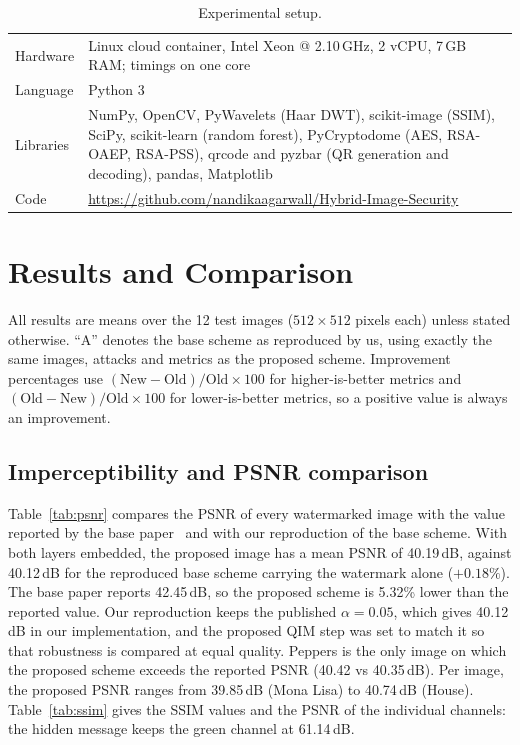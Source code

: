 \documentclass[11pt,a4paper]{article}
\begin{document}
\begin{table}[!htbp]
\centering\small
\caption{Experimental setup.}\label{tab:setup}
\begin{tabularx}{\textwidth}{@{}lX@{}}
\toprule
Hardware & Linux cloud container, Intel Xeon @ 2.10\,GHz, 2 vCPU, 7\,GB RAM; timings on one core %
\\
Language & Python 3 \\
Libraries & NumPy, OpenCV, PyWavelets (Haar DWT), scikit-image (SSIM), SciPy, scikit-learn (random forest), PyCryptodome (AES, RSA-OAEP, RSA-PSS), qrcode and pyzbar (QR generation and decoding), pandas, Matplotlib \\
Code & \url{https://github.com/nandikaagarwall/Hybrid-Image-Security} \\
\bottomrule
\end{tabularx}
\end{table}

\section{Results and Comparison}\label{sec:results}

All results are means over the 12 test images ($512\times512$ pixels each) unless stated otherwise. ``A'' denotes the base scheme as reproduced by us, using exactly the same images, attacks and metrics as the proposed scheme. Improvement percentages use $(\text{New}-\text{Old})/\text{Old}\times100$ for higher-is-better metrics and $(\text{Old}-\text{New})/\text{Old}\times100$ for lower-is-better metrics, so a positive value is always an improvement.

\FloatBarrier
\subsection{Imperceptibility and PSNR comparison}\label{sec:res-imp}

Table~\ref{tab:psnr} compares the PSNR of every watermarked image with the value reported by the base paper~\cite{sanivarapu2022} and with our reproduction of the base scheme. With both layers embedded, the proposed image has a mean PSNR of 40.19\,dB, against 40.12\,dB for the reproduced base scheme carrying the watermark alone ($+0.18\%$). The base paper reports 42.45\,dB, so the proposed scheme is 5.32\% lower than the reported value. Our reproduction keeps the published $\alpha=0.05$, which gives 40.12\,dB in our implementation, and the proposed QIM step was set to match it so that robustness is compared at equal quality. Peppers is the only image on which the proposed scheme exceeds the reported PSNR (40.42 vs 40.35\,dB). Per image, the proposed PSNR ranges from 39.85\,dB (Mona Lisa) to 40.74\,dB (House).
Table~\ref{tab:ssim} gives the SSIM values and the PSNR of the individual channels: the hidden message keeps the green channel at 61.14\,dB.
\end{document}

